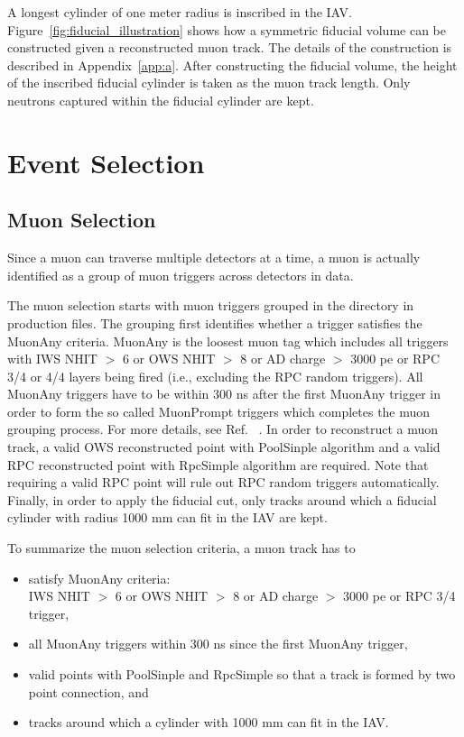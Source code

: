 A longest cylinder of one meter radius is inscribed in the IAV. Figure~\ref{fig:fiducial_illustration} shows how a symmetric fiducial volume can be constructed given a reconstructed muon track. The details of the construction is described in Appendix~\ref{app:a}.
After constructing the fiducial volume, the height of the inscribed fiducial cylinder is taken as the muon track length. Only neutrons captured within the fiducial cylinder are kept.


\section{Event Selection}

\subsection{Muon Selection}

Since a muon can traverse multiple detectors at a time, a muon is actually identified as a group of muon triggers across detectors in data.

The muon selection starts with muon triggers grouped in the directory \scriptsize{} \normalsize in production files. The grouping first identifies whether a trigger satisfies the MuonAny criteria. MuonAny is the loosest muon tag which includes all triggers with IWS NHIT $>$ 6 or OWS NHIT $>$ 8 or AD charge $>$ 3000 pe or RPC 3/4 or 4/4 layers being fired (i.e., excluding the RPC random triggers). All MuonAny triggers have to be within 300 ns after the first MuonAny trigger in order to form the so called MuonPrompt triggers which completes the muon grouping process. For more details, see Ref.~\cite{docdb6759} . In order to reconstruct a muon track, a valid OWS reconstructed point with PoolSinple algorithm and a valid RPC reconstructed point with RpcSimple algorithm are required. Note that requiring a valid RPC point will rule out RPC random triggers automatically. Finally, in order to apply the fiducial cut, only tracks around which a fiducial cylinder with radius 1000 mm can fit in the IAV are kept.

\vspace{\baselineskip}
To summarize the muon selection criteria, a muon track has to
\begin{itemize}
  \item satisfy MuonAny criteria:
        \\IWS NHIT $>$ 6 or OWS NHIT $>$ 8 or AD charge $>$ 3000 pe or RPC 3/4 trigger,
  \item all MuonAny triggers within 300 ns since the first MuonAny trigger,
  \item valid points with PoolSinple and RpcSimple so that a track is formed by two point connection, and
  \item tracks around which a cylinder with 1000 mm can fit in the IAV.
\end{itemize}

